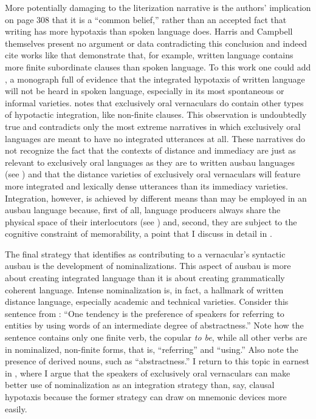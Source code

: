 More potentially damaging to the literization narrative is the authors’ implication on page 308 that it is a “common belief,” rather than an accepted fact that writing has more hypotaxis than spoken language does. Harris and Campbell themselves present no argument or data contradicting this conclusion and indeed cite works like \citet{Chafe1982} that demonstrate that, for example, written language contains more finite subordinate clauses than spoken language. To this work one could add \citet{MillerWeinert1998}, a monograph full of evidence that the integrated hypotaxis of written language will not be heard in spoken language, especially in its most spontaneous or informal varieties. \citet{HarrisCampbell1995} notes that exclusively oral vernaculars do contain other types of hypotactic integration, like non-finite clauses. This observation is undoubtedly true and contradicts only the most extreme narratives in which exclusively oral languages are meant to have no integrated utterances at all. These narratives do not recognize the fact that the contexts of distance and immediacy are just as relevant to exclusively oral languages as they are to written ausbau languages (see ) and that the distance varieties of exclusively oral vernaculars will feature more integrated and lexically dense utterances than its immediacy varieties. Integration, however, is achieved by different means than may be employed in an ausbau language because, first of all, language producers always share the physical space of their interlocutors (see ) and, second, they are subject to the cognitive constraint of memorability, a point that I discuss in detail in .

The final strategy that \citet[591]{KochOesterreicher1994} identifies as contributing to a vernacular’s syntactic ausbau is the development of nominalizations. This aspect of ausbau is more about creating integrated language than it is about creating grammatically coherent language. Intense nominalization is, in fact, a hallmark of written distance language, especially academic and technical varieties. Consider this sentence from \citet[137]{Chafe1981}: “One tendency is the preference of speakers for referring to entities by using words of an intermediate degree of abstractness.” Note how the sentence contains only one finite verb, the copular \textit{to be}, while all other verbs are in nominalized, non-finite forms, that is, “referring” and “using.” Also note the presence of derived nouns, such as “abstractness.” I return to this topic in earnest in , where I argue that the speakers of exclusively oral vernaculars can make better use of nominalization as an integration strategy than, say, clausal hypotaxis because the former strategy can draw on mnemonic devices more easily.

